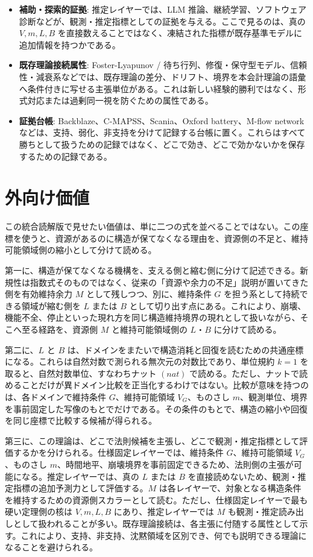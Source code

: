 \documentclass[12pt,a4paper]{article}
\begin{document}
\begin{itemize}
\item
  \textbf{補助・探索的証拠}: 推定レイヤーでは、LLM 推論、継続学習、ソフトウェア診断などが、観測・推定指標としての証拠を与える。ここで見るのは、真の \(V,m,L,B\) を直接数えることではなく、凍結された指標が既存基準モデルに追加情報を持つかである。
\item
  \textbf{既存理論接続属性}: Foster-Lyapunov / 待ち行列、修復・保守型モデル、信頼性・減衰系などでは、既存理論の差分、ドリフト、境界を本会計理論の語彙へ条件付きに写せる主張単位がある。これは新しい経験的勝利ではなく、形式対応または過剰同一視を防ぐための属性である。
\item
  \textbf{証拠台帳}: Backblaze、C-MAPSS、Scania、Oxford battery、M-flow network などは、支持、弱化、非支持を分けて記録する台帳に置く。これらはすべて勝ちとして扱うための記録ではなく、どこで効き、どこで効かないかを保存するための記録である。
\end{itemize}

\section{外向け価値}\label{ux5916ux5411ux3051ux4fa1ux5024}

この統合読解版で見せたい価値は、単に二つの式を並べることではない。この座標を使うと、資源があるのに構造が保てなくなる理由を、資源側の不足と、維持可能領域側の縮小として分けて読める。

第一に、構造が保てなくなる機構を、支える側と縮む側に分けて記述できる。新規性は指数式そのものではなく、従来の「資源や余力の不足」説明が置いてきた側を有効維持余力 \(M\) として残しつつ、別に、維持条件 \(G\) を担う系として持続できる領域が縮む側を \(L\) または \(B\) として切り出す点にある。これにより、崩壊、機能不全、停止といった現れ方を同じ構造維持境界の現れとして扱いながら、そこへ至る経路を、資源側 \(M\) と維持可能領域側の \(L\)・\(B\) に分けて読める。

第二に、\(L\) と \(B\) は、ドメインをまたいで構造消耗と回復を読むための共通座標になる。これらは自然対数で測られる無次元の対数比であり、単位規約 \(k=1\) を取ると、自然対数単位、すなわちナット \((nat)\) で読める。ただし、ナットで読めることだけが異ドメイン比較を正当化するわけではない。比較が意味を持つのは、各ドメインで維持条件 \(G\)、維持可能領域 \(V_{G}\)、ものさし \(m\)、観測単位、境界を事前固定した写像のもとでだけである。その条件のもとで、構造の縮小や回復を同じ座標で比較する候補が得られる。

第三に、この理論は、どこで法則候補を主張し、どこで観測・推定指標として評価するかを分けられる。仕様固定レイヤーでは、維持条件 \(G\)、維持可能領域 \(V_{G}\)、ものさし \(m\)、時間地平、崩壊境界を事前固定できるため、法則側の主張が可能になる。推定レイヤーでは、真の \(L\) または \(B\) を直接読めないため、観測・推定指標の追加予測力として評価する。\(M\) は各レイヤーで、対象となる構造条件を維持するための資源側スカラーとして読む。ただし、仕様固定レイヤーで最も硬い定理側の核は \(V,m,L,B\) にあり、推定レイヤーでは \(M\) も観測・推定読み出しとして扱われることが多い。既存理論接続は、各主張に付随する属性として示す。これにより、支持、非支持、沈黙領域を区別でき、何でも説明できる理論になることを避けられる。
\end{document}
